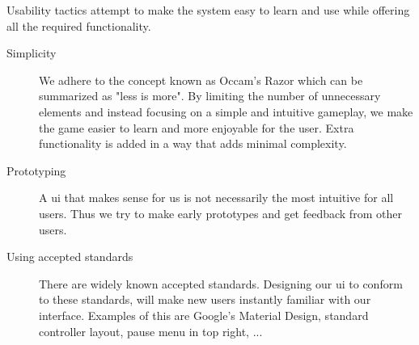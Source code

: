 	Usability tactics attempt to make the system easy to learn and use while offering all the required functionality.

		\begin{description}
			\item[Simplicity]
			We adhere to the concept known as Occam's Razor which can be summarized as "less is more". By limiting the number of unnecessary elements and instead focusing on a simple and intuitive gameplay, we make the game easier to learn and more enjoyable for the user. Extra functionality is added in a way that adds minimal complexity.

			\item[Prototyping]
			A \gls{ui} that makes sense for us is not necessarily the most intuitive for all users. Thus we try to make early prototypes and get feedback from other users.

			\item[Using accepted standards]
			There are widely known accepted standards. Designing our \gls{ui} to conform to these standards, will make new users instantly familiar with our interface. Examples of this are Google's Material Design, standard controller layout, pause menu in top right, ...

		\end{description}
